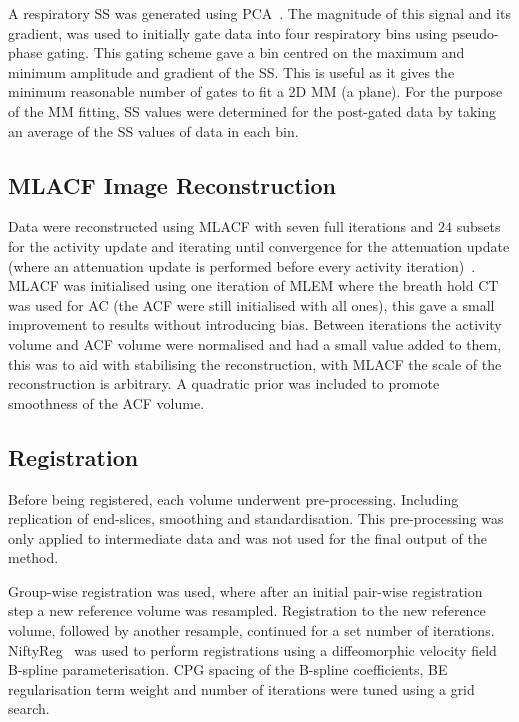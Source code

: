         A respiratory \gls{SS} was generated using \gls{PCA}~\cite{Thielemans2011}. The magnitude of this signal and its gradient, was used to initially gate data into four respiratory bins using pseudo-phase gating. This gating scheme gave a bin centred on the maximum and minimum amplitude and gradient of the \gls{SS}. This is useful as it gives the minimum reasonable number of gates to fit a \gls{2D} \gls{MM} (a plane). For the purpose of the \gls{MM} fitting, \gls{SS} values were determined for the post-gated data by taking an average of the \gls{SS} values of data in each bin.
        
    \subsection{MLACF Image Reconstruction} \label{sec:mlacf_image_reconstruction}
        Data were reconstructed using \gls{MLACF} with seven full iterations and $24$ subsets for the activity update and iterating until convergence for the attenuation update (where an attenuation update is performed before every activity iteration)~\cite{Mizuta2022InitialPET}. \gls{MLACF} was initialised using one iteration of \gls{MLEM} where the breath hold \gls{CT} was used for \gls{AC} (the \gls{ACF} were still initialised with all ones), this gave a small improvement to results without introducing bias. Between iterations the activity volume and \gls{ACF} volume were normalised and had a small value added to them, this was to aid with stabilising the reconstruction, with \gls{MLACF} the scale of the reconstruction is arbitrary. A quadratic prior was included to promote smoothness of the \gls{ACF} volume.
    
    
    \subsection{Registration} \label{sec:registration}
        Before being registered, each volume underwent pre-processing. Including replication of end-slices, smoothing and standardisation. This pre-processing was only applied to intermediate data and was not used for the final output of the method.
        
        Group-wise registration was used, where after an initial pair-wise registration step a new reference volume was resampled. Registration to the new reference volume, followed by another resample, continued for a set number of iterations. NiftyReg~\cite{Modat2010} was used to perform registrations using a diffeomorphic velocity field B-spline parameterisation. \gls{CPG} spacing of the B-spline coefficients, \gls{BE} regularisation term weight and number of iterations were tuned using a grid search.
    
